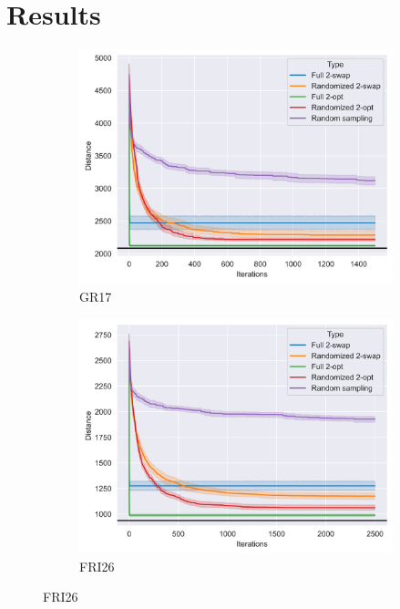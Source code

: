 \documentclass{article}
\begin{document}
\section{Results}

\begin{figure}[h]
    \begin{subfigure}[b]{0.3\textwidth}
        \includegraphics[width=\textwidth]{images/gr17_plot.png}
        \caption{GR17}
    \end{subfigure}
    \hfill
    \begin{subfigure}[b]{0.3\textwidth}
        \includegraphics[width=\textwidth]{images/fri26_plot.png}
        \caption{FRI26}
    \end{subfigure}

\end{figure}
\end{document}
